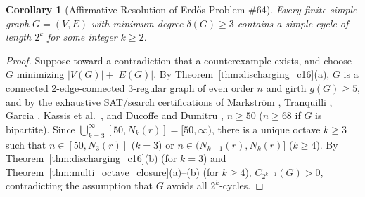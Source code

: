\documentclass[10pt,a4paper]{article}
\newtheorem{corollary}[theorem]{Corollary}
\theoremstyle{definition}
\theoremstyle{remark}
\begin{document}
\begin{corollary}[Affirmative Resolution of Erd\H{o}s Problem \#64]\label{cor:erdos_gyarfas}
Every finite simple graph $G = (V, E)$ with minimum degree $\delta(G) \ge 3$ contains a simple cycle of length $2^k$ for some integer $k \ge 2$.
\end{corollary}

\begin{proof}
Suppose toward a contradiction that a counterexample exists, and choose $G$ minimizing $|V(G)| + |E(G)|$. By Theorem~\ref{thm:discharging_c16}(a), $G$ is a connected 2-edge-connected 3-regular graph of even order $n$ and girth $g(G) \ge 5$, and by the exhaustive SAT/search certifications of Markstr\"om \cite{markstrom2004extremal}, Tranquilli \cite{tranquilli2026bipartite}, Garcia \cite{garcia2026sat}, Kassis et al.\ \cite{kassis2026bipartite}, and Ducoffe and Dumitru \cite{ducoffe2026structured}, $n \ge 50$ ($n \ge 68$ if $G$ is bipartite). Since $\bigcup_{k=3}^\infty [50, N_k(r)] = [50, \infty)$, there is a unique octave $k \ge 3$ such that $n \in [50, N_3(r)]$ ($k=3$) or $n \in (N_{k-1}(r), N_k(r)]$ ($k \ge 4$). By Theorem~\ref{thm:discharging_c16}(b) (for $k = 3$) and Theorem~\ref{thm:multi_octave_closure}(a)--(b) (for $k \ge 4$), $C_{2^{k+1}}(G) > 0$, contradicting the assumption that $G$ avoids all $2^k$-cycles.
\end{proof}
\end{document}
